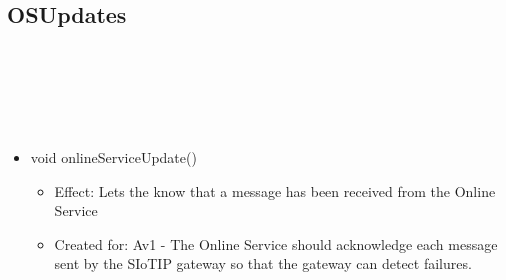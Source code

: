   \subsection{OSUpdates}\label{int:GatewayGatewayOnlineServiceCommunicationHandlerOnlineServiceMonitorOSUpdates}
    \begin{description}
      \item[Provided by:] \iconcomponent{}~
      \item[Required by:] \iconcomponent{}~
      \item[Operations:] ~
    \begin{itemize}[noitemsep,nolistsep,leftmargin=-.25cm]
      \item \textsf{void onlineServiceUpdate()}
        \begin{itemize}[noitemsep,nolistsep]
           \item Effect: Lets the  know that a message has been received from the Online Service
\item Created for: Av1 - The Online Service should acknowledge each message sent by the SIoTIP gateway so that the gateway can detect failures.
        \end{itemize}
    \end{itemize}
    \end{description}

